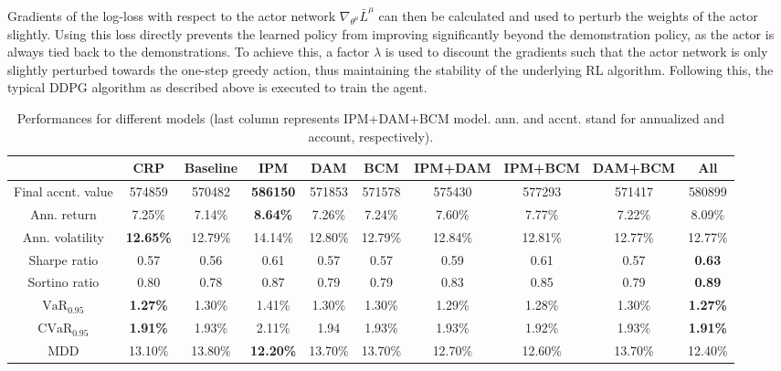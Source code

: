 \documentclass{article}
\begin{document}
Gradients of the log-loss with respect to the actor network $\nabla_{\theta^\mu}\bar{L}^\mu$ can then be calculated and used to perturb the weights of the actor slightly.  Using this
loss directly prevents the learned policy from improving significantly beyond the demonstration policy, as the actor is always tied back to the demonstrations. To achieve this, a factor $\lambda$ is used to discount the gradients such that the actor network is only slightly perturbed towards the one-step greedy action, thus maintaining the stability of the underlying RL algorithm. Following this, the typical DDPG algorithm as described above is executed to train the agent.

\begin{table}[t]
\caption{Performances for different models (last column represents IPM+DAM+BCM model. ann. and accnt. stand for annualized and account, respectively).}
\label{performance}
\begin{center}
\begin{small}
\begin{tabular}{|c|c|c|c|c|c|c|c|c|c|}
\hline

                      & CRP    & Baseline & IPM              & DAM     & BCM     & IPM+DAM & IPM+BCM & DAM+BCM          & All      \\ \hline
Final accnt. value   & 574859 & 570482   & \textbf{586150}  & 571853  & 571578  & 575430  & 577293  & 571417           & 580899           \\ \hline
Ann. return     & 7.25\% & 7.14\%   & \textbf{8.64\%}  & 7.26\%  & 7.24\%  & 7.60\%  & 7.77\%  & 7.22\%           & 8.09\%           \\ \hline
Ann. volatility & \textbf{12.65\%}& 12.79\%  & 14.14\%          & 12.80\% & 12.79\% & 12.84\% & 12.81\% & {12.77\%} & {12.77\%} \\ \hline
Sharpe ratio          & 0.57    & 0.56     & 0.61             & 0.57    & 0.57    & 0.59    & 0.61    & 0.57             & \textbf{0.63}    \\ \hline
Sortino ratio         & 0.80   & 0.78     & 0.87             & 0.79    & 0.79    & 0.83    & 0.85    & 0.79             & \textbf{0.89}    \\ \hline
$\text{VaR}_{0.95}$                   & \textbf{1.27\%} & 1.30\%   & 1.41\%           & 1.30\%  & 1.30\%  & 1.29\%  & 1.28\%  & 1.30\%           & \textbf{1.27\%}  \\ \hline
$\text{CVaR}_{0.95}$                  & \textbf{1.91\%} & 1.93\%   & 2.11\%           & 1.94    & 1.93\%  & 1.93\%  & 1.92\%  & 1.93\%           & \textbf{1.91\%}  \\ \hline
MDD                   & 13.10\% & 13.80\%  & \textbf{12.20\%} & 13.70\% & 13.70\% & 12.70\% & 12.60\% & 13.70\%          & 12.40\%          \\ \hline
\end{tabular}
\end{small}
\end{center}
\vskip -0.1in
\end{table}
\end{document}
